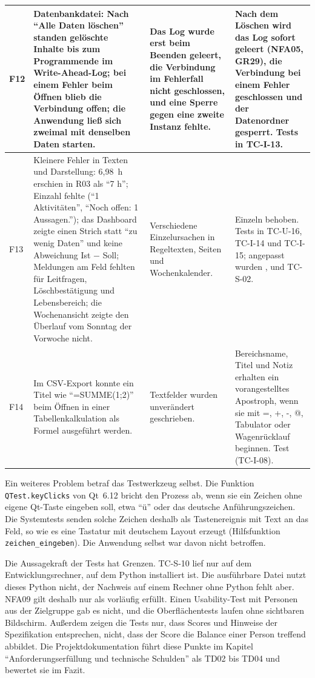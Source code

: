 \begin{longtable}{@{}L{0.7cm}L{4.4cm}L{4.6cm}L{6.0cm}@{}}
  \midrule
  F12 & Datenbankdatei: Nach \enquote{Alle Daten löschen} standen gelöschte Inhalte bis zum Programmende im Write-Ahead-Log; bei einem Fehler beim Öffnen blieb die Verbindung offen; die Anwendung ließ sich zweimal mit denselben Daten starten. & Das Log wurde erst beim Beenden geleert, die Verbindung im Fehlerfall nicht geschlossen, und eine Sperre gegen eine zweite Instanz fehlte. & Nach dem Löschen wird das Log sofort geleert (NFA05, GR29), die Verbindung bei einem Fehler geschlossen und der Datenordner gesperrt. Tests in TC-I-13. \\
  \midrule
  F13 & Kleinere Fehler in Texten und Darstellung: 6,98~h erschien in R03 als \enquote{7 h}; Einzahl fehlte (\enquote{1 Aktivitäten}, \enquote{Noch offen: 1 Aussagen.}); das Dashboard zeigte einen Strich statt \enquote{zu wenig Daten} und keine Abweichung Ist $-$ Soll; Meldungen am Feld fehlten für Leitfragen, Löschbestätigung und Lebensbereich; die Wochenansicht zeigte den Überlauf vom Sonntag der Vorwoche nicht. & Verschiedene Einzelursachen in Regeltexten, Seiten und Wochenkalender. & Einzeln behoben. Tests in TC-U-16, TC-I-14 und TC-I-15; angepasst wurden ,  und TC-S-02. \\
  \midrule
  F14 & Im CSV-Export konnte ein Titel wie \enquote{=SUMME(1;2)} beim Öffnen in einer Tabellenkalkulation als Formel ausgeführt werden. & Textfelder wurden unverändert geschrieben. & Bereichsname, Titel und Notiz erhalten ein vorangestelltes Apostroph, wenn sie mit =, +, -, @, Tabulator oder Wagenrücklauf beginnen. Test  (TC-I-08). \\
\end{longtable}

Ein weiteres Problem betraf das Testwerkzeug selbst. Die Funktion \texttt{QTest.keyClicks} von Qt~6.12 bricht den Prozess ab, wenn sie ein Zeichen ohne eigene Qt-Taste eingeben soll, etwa \enquote{ü} oder das deutsche Anführungszeichen. Die Systemtests senden solche Zeichen deshalb als Tastenereignis mit Text an das Feld, so wie es eine Tastatur mit deutschem Layout erzeugt (Hilfsfunktion \texttt{zeichen\_eingeben}). Die Anwendung selbst war davon nicht betroffen.

Die Aussagekraft der Tests hat Grenzen. TC-S-10 lief nur auf dem Entwicklungsrechner, auf dem Python installiert ist. Die ausführbare Datei nutzt dieses Python nicht, der Nachweis auf einem Rechner ohne Python fehlt aber. NFA09 gilt deshalb nur als vorläufig erfüllt. Einen Usability-Test mit Personen aus der Zielgruppe gab es nicht, und die Oberflächentests laufen ohne sichtbaren Bildschirm. Außerdem zeigen die Tests nur, dass Scores und Hinweise der Spezifikation entsprechen, nicht, dass der Score die Balance einer Person treffend abbildet. Die Projektdokumentation führt diese Punkte im Kapitel \enquote{Anforderungserfüllung und technische Schulden} als TD02 bis TD04 und bewertet sie im Fazit.
